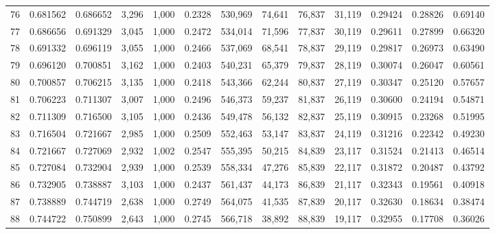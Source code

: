\begin{tabular}{rrrrrrrrrrrrr}
76  &  0.681562 &  0.686652 &   3,296 &  1,000 &                                     0.2328 &  530,969 &   74,641 &   76,837 &   31,119 &  0.29424 &  0.28826 &  0.69140 \\
77  &  0.686656 &  0.691329 &   3,045 &  1,000 &                                     0.2472 &  534,014 &   71,596 &   77,837 &   30,119 &  0.29611 &  0.27899 &  0.66320 \\
78  &  0.691332 &  0.696119 &   3,055 &  1,000 &                                     0.2466 &  537,069 &   68,541 &   78,837 &   29,119 &  0.29817 &  0.26973 &  0.63490 \\
79  &  0.696120 &  0.700851 &   3,162 &  1,000 &                                     0.2403 &  540,231 &   65,379 &   79,837 &   28,119 &  0.30074 &  0.26047 &  0.60561 \\
80  &  0.700857 &  0.706215 &   3,135 &  1,000 &                                     0.2418 &  543,366 &   62,244 &   80,837 &   27,119 &  0.30347 &  0.25120 &  0.57657 \\
81  &  0.706223 &  0.711307 &   3,007 &  1,000 &                                     0.2496 &  546,373 &   59,237 &   81,837 &   26,119 &  0.30600 &  0.24194 &  0.54871 \\
82  &  0.711309 &  0.716500 &   3,105 &  1,000 &                                     0.2436 &  549,478 &   56,132 &   82,837 &   25,119 &  0.30915 &  0.23268 &  0.51995 \\
83  &  0.716504 &  0.721667 &   2,985 &  1,000 &                                     0.2509 &  552,463 &   53,147 &   83,837 &   24,119 &  0.31216 &  0.22342 &  0.49230 \\
84  &  0.721667 &  0.727069 &   2,932 &  1,002 &                                     0.2547 &  555,395 &   50,215 &   84,839 &   23,117 &  0.31524 &  0.21413 &  0.46514 \\
85  &  0.727084 &  0.732904 &   2,939 &  1,000 &                                     0.2539 &  558,334 &   47,276 &   85,839 &   22,117 &  0.31872 &  0.20487 &  0.43792 \\
86  &  0.732905 &  0.738887 &   3,103 &  1,000 &                                     0.2437 &  561,437 &   44,173 &   86,839 &   21,117 &  0.32343 &  0.19561 &  0.40918 \\
87  &  0.738889 &  0.744719 &   2,638 &  1,000 &                                     0.2749 &  564,075 &   41,535 &   87,839 &   20,117 &  0.32630 &  0.18634 &  0.38474 \\
88  &  0.744722 &  0.750899 &   2,643 &  1,000 &                                     0.2745 &  566,718 &   38,892 &   88,839 &   19,117 &  0.32955 &  0.17708 &  0.36026 \\

\end{tabular}
